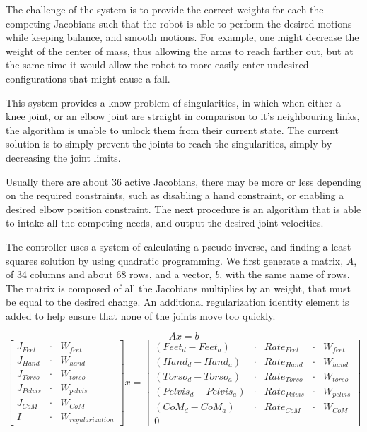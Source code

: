 \documentclass[12pt]{report}
\begin{document}
The challenge of the system is to provide the correct weights for each the competing Jacobians such that the robot is able to perform the desired motions while keeping balance, and smooth motions. For example, one might decrease the weight of the center of mass, thus allowing the arms to reach farther out, but at the same time it would allow the robot to more easily enter undesired configurations that might cause a fall.

This system provides a know problem of singularities, in which when either a knee joint, or an elbow joint are straight in comparison to it's neighbouring links, the algorithm is unable to unlock them from their current state. The current solution is to simply prevent the joints to reach the singularities, simply by decreasing the joint limits. 

Usually there are about 36 active Jacobians, there may be more or less depending on the required constraints, such as disabling a hand constraint, or enabling a desired elbow position constraint. The next procedure is an algorithm that is able to intake all the competing needs, and output the desired joint velocities. 

The controller uses a system of calculating a pseudo-inverse, and finding a least squares solution by using quadratic programming. We first generate a matrix, $A$, of 34 columns and about 68 rows, and a vector, $b$, with the same name of rows. The matrix is composed of all the Jacobians multiplies by an weight, that must be equal to the desired change. An additional regularization identity element is added to help ensure that none of the joints move too quickly. 

\begin{equation} 
Ax = b 
\end{equation}
\begin{equation} 
\begin{bmatrix}
J_{Feet} &\cdot & W_{feet} \\
J_{Hand} &\cdot & W_{hand} \\
J_{Torso} &\cdot & W_{torso} \\
J_{Pelvis} &\cdot & W_{pelvis} \\
J_{CoM} &\cdot & W_{CoM} \\
I &\cdot & W_{regularization}
\end{bmatrix}
x = 
\begin{bmatrix}
(Feet_d - Feet_a) &\cdot & {Rate}_{Feet} &\cdot & W_{feet} \\
(Hand_d - Hand_a) &\cdot & {Rate}_{Hand} &\cdot & W_{hand} \\
(Torso_d - Torso_a) &\cdot & {Rate}_{Torso} &\cdot & W_{torso} \\
(Pelvis_d - Pelvis_a) &\cdot & {Rate}_{Pelvis} &\cdot & W_{pelvis} \\
(CoM_d - CoM_a) &\cdot & {Rate}_{CoM} &\cdot & W_{CoM} \\
0
\end{bmatrix}
\end{equation}
\end{document}
